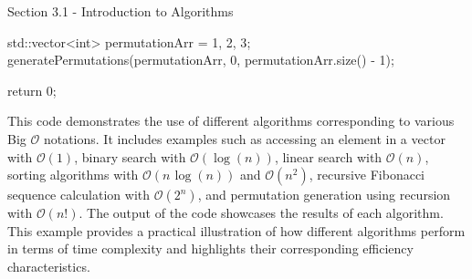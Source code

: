 \begin{notes}{Section 3.1 - Introduction to Algorithms}
\begin{highlight}
\begin{code}[C++]
{        std::vector<int> permutationArr = {1, 2, 3};
        generatePermutations(permutationArr, 0, permutationArr.size() - 1);

        return 0;
    }
    \end{code}
        This code demonstrates the use of different algorithms corresponding to various Big $\mathcal{O}$ notations. It includes examples such as accessing an element in a vector with $\mathcal{O}(1)$, binary search with $\mathcal{O}(\log{(n)})$, linear search with $\mathcal{O}(n)$, sorting algorithms with $\mathcal{O}(n\hspace{1pt}\log{(n)})$ and $\mathcal{O}(n^2)$, recursive Fibonacci sequence calculation with $\mathcal{O}(2^n)$, 
        and permutation generation using recursion with $\mathcal{O}(n!)$. The output of the code showcases the results of each algorithm. This example provides a practical illustration of how different algorithms perform in terms of time complexity and highlights their corresponding efficiency characteristics.
    \end{highlight}
\end{notes}

